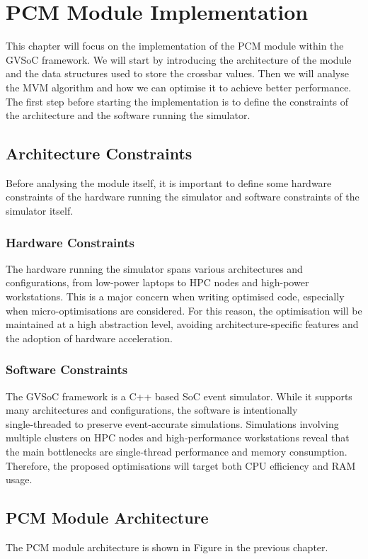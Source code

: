 \chapter{PCM Module Implementation}\label{chap:module}
This chapter will focus on the implementation of the PCM module within the GVSoC framework.
We will start by introducing the architecture of the module and the data structures used to store the crossbar values.
Then we will analyse the MVM algorithm and how we can optimise it to achieve better performance.
The first step before starting the implementation is to define the constraints of the architecture and the software running the simulator.

\section{Architecture Constraints}\label{sec:arch_const}
Before analysing the module itself, it is important to define some hardware constraints of the hardware running the simulator and software constraints of the simulator itself.

\subsection{Hardware Constraints}\label{sec:hw_const}
The hardware running the simulator spans various architectures and configurations, from low-power laptops to HPC nodes and high-power workstations.
This is a major concern when writing optimised code, especially when micro-optimisations are considered.
For this reason, the optimisation will be maintained at a high abstraction level, avoiding architecture-specific features and the adoption of hardware acceleration.

\subsection{Software Constraints}\label{sec:sw_const}
The GVSoC framework is a C++ based SoC event simulator. While it supports many architectures and configurations, the software is intentionally single‑threaded to preserve event‑accurate simulations.
Simulations involving multiple clusters on HPC nodes and high‑performance workstations reveal that the main bottlenecks are single‑thread performance and memory consumption. Therefore, the proposed optimisations will target both CPU efficiency and RAM usage.

\section{PCM Module Architecture}\label{sec:module_arch}
The PCM module architecture is shown in Figure  in the previous chapter.

